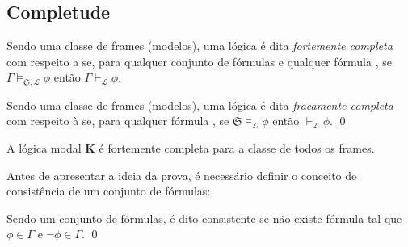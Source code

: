         \subsection{Completude}
            \label{subsec:Completude}

            \begin{definicao}[Completude]
                Sendo  uma classe de frames (modelos), uma lógica  é dita \textit{fortemente completa} com respeito a  se,
                para qualquer conjunto de fórmulas \GAMMA e qualquer fórmula \PHI, se \(\Gamma \vDash_{\mathfrak{S},\mathcal{L}} \phi\)
                então \(\Gamma \vdash_{\mathcal{L}} \phi\).

                Sendo  uma classe de frames (modelos), uma lógica  é dita \textit{fracamente completa} com respeito à  se,
                para qualquer fórmula \PHI, se \(\mathfrak{S} \vDash_{\mathcal{L}} \phi\) então \(\vdash_{\mathcal{L}} \phi\). \qed
            \end{definicao}

            \begin{teorema}
                \label{teo:CompletudeLogicaModal}
                A lógica modal \textbf{K} é fortemente completa para a classe de todos os frames.
            \end{teorema}

            Antes de apresentar a ideia da prova, é necessário definir o conceito de consistência de um conjunto de fórmulas:

            \sloppy
            \begin{definicao}[Consistência]
                Sendo \GAMMA um conjunto de fórmulas, \GAMMA é dito consistente se não existe fórmula \PHI tal que \({\phi \in \Gamma \text{ e } \neg \phi \in \Gamma}\). \qed
            \end{definicao}


